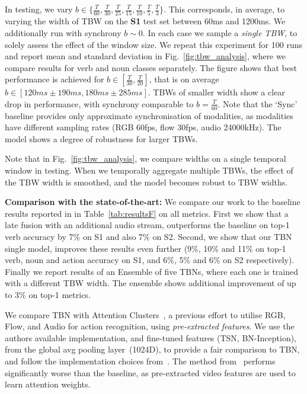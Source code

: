 \documentclass[10pt,twocolumn,letterpaper]{article}
\begin{document}
In testing, we vary $b \in \{\frac{T}{60}, \frac{T}{30}, \frac{T}{25}, \frac{T}{15}, \frac{T}{10}, \frac{T}{5}, \frac{T}{3}\}$. This corresponds, in average, to varying the width of TBW on the \textbf{S1} test set between 60ms and 1200ms.
We additionally run with synchrony $b \sim 0$. 
In each case we sample a \textit{single TBW}, to solely assess the effect of the window size. We repeat this experiment for 100 runs and report mean and standard deviation in Fig.~\ref{fig:tbw_analysis}, where we compare results for verb and noun classes separately. The figure shows that 
best performance is achieved for $b \in \left[\frac{T}{30}, \frac{T}{20}\right]$, that is on average $b \in \left[120ms\pm190ms, 180ms\pm285ms\right]$. TBWs of smaller width show a clear drop in performance, with synchrony comparable to $b = \frac{T}{60}$. 
Note that the `Sync' baseline provides only approximate synchronisation of modalities, as modalities have different sampling rates (RGB 60fps, flow 30fps, audio 24000kHz).
The model shows a degree of robustness for larger TBWs. 

Note that in Fig.~\ref{fig:tbw_analysis}, we compare widths on a single temporal window in testing. When we temporally aggregate multiple TBWs, the effect of the TBW width is smoothed, and the model becomes robust to TBW widths. 

\noindent \textbf{Comparison with the state-of-the-art: }
We compare our work to the baseline results reported in \cite{Damen_2018_ECCV} in Table~\ref{tab:resultsF} on all metrics.
First we show that a late fusion with an additional audio stream, outperforms the baseline on top-1 verb accuracy by 7\% on S1 and also 7\% on S2. 
Second, we show that our TBN single model, improves these results even further (9\%, 10\% and 11\% on top-1 verb, noun and action accuracy on S1, and 6\%, 5\% and 6\% on S2 respectively). 
Finally we report results of an Ensemble of five TBNs, where each one is trained with a different TBW width. The ensemble shows additional improvement of up to 3\% on top-1 metrics.

We compare TBN with Attention Clusters~\cite{Long_2018_CVPR}, a previous effort to utilise RGB, Flow, and Audio for action recognition, using \textit{pre-extracted features}.
We use the authors available implementation, and fine-tuned features (TSN, BN-Inception), from the global avg pooling layer~(1024D), to
provide a fair comparison to TBN, and follow the implementation choices from~\cite{Long_2018_CVPR}.
The method from~\cite{Long_2018_CVPR} performs significantly worse than the baseline, as pre-extracted video features are used to learn attention weights. 
\end{document}
